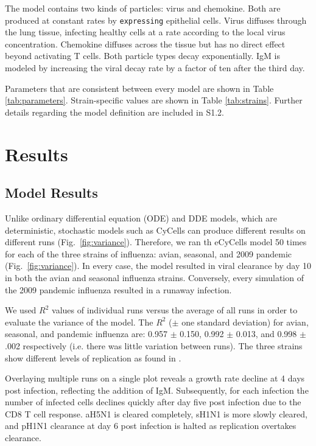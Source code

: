 \documentclass[10pt]{article}
\begin{document}
The model contains two kinds of particles: virus and chemokine. Both are produced at constant rates by \texttt{expressing} epithelial cells.  Virus diffuses through the lung tissue, infecting healthy cells at a rate according to the local virus concentration. Chemokine diffuses across the tissue but has no direct effect beyond activating T cells. Both particle types decay exponentially.  IgM is modeled by increasing the viral decay rate by a factor of ten after the third day.

Parameters that are consistent between every model are shown in Table \ref{tab:parameters}.  Strain-specific values are shown in Table \ref{tab:strains}.  Further details regarding the model definition are included in S1.2.


\section*{Results}

\subsection*{Model Results}


Unlike ordinary differential equation (ODE) and DDE models, which are deterministic, stochastic models such as CyCells can produce different results on different runs (Fig.~\ref{fig:variance}).  Therefore, we ran th eCyCells model 50 times for each of the three strains of influenza: avian, seasonal, and 2009 pandemic (Fig.~\ref{fig:variance}).  In every case, the model resulted in viral clearance by day 10 in both the avian and seasonal influenza strains.  Conversely, every simulation of the 2009 pandemic influenza resulted in a runaway infection.

We used $R^2$ values of individual runs versus the average of all runs in order to evaluate the variance of the model.  The $R^2$ ($\pm$ one standard deviation) for avian, seasonal, and pandemic influenza are: 0.957 $\pm$ 0.150, 0.992 $\pm$ 0.013, and 0.998 $\pm$ .002 respectively (i.e. there was little variation between runs).  The three strains show different levels of replication as found in \cite{Mitchell2011}.  

Overlaying multiple runs on a single plot reveals a growth rate decline at 4 days post infection, reflecting the addition of IgM.  Subsequently, for each infection the number of infected cells declines quickly after day five post infection due to the CD8 T cell response.  aH5N1 is cleared completely, sH1N1 is more slowly cleared, and pH1N1 clearance at day 6 post infection is halted as replication overtakes clearance.
\end{document}
